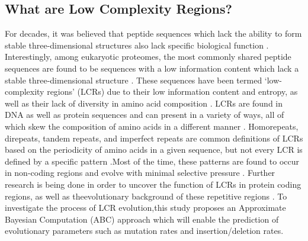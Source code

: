 \documentclass{article}
\begin{document}
\subsection{What are Low Complexity Regions?}
For decades, it was believed that peptide sequences which lack the ability to form stable three-dimensional structures also lack specific biological function \citep{haerty2010low}. Interestingly, among eukaryotic proteomes, the most commonly
shared peptide sequences are found to be sequences with a low information content which lack a stable three-dimensional
structure \citep{haerty2010low, marcotte1999census, bannen2007effect}. These sequences have been termed ‘low-
complexity regions’ (LCRs) due to their low information content and entropy, as well as their lack of diversity in amino acid
composition \citep{wootton1993statistics, coletta2010low}. LCRs are found in DNA as well as protein sequences and can
present in a variety of ways, all of which skew the composition of amino acids in a different manner \citep{wootton1993statistics, mier2020disentangling}. Homorepeats, direpeats, tandem repeats, and imperfect repeats are common definitions of LCRs based
on the periodicity of amino acids in a given sequence, but not every LCR is defined by a specific pattern \citep{mier2020disentangling}.Most of the time, these patterns are found to occur in non-coding regions and evolve with minimal selective pressure \citep{kruglyak2000distribution}. Further research is being done in order to uncover the function of LCRs in protein coding regions, as well as theevolutionary background of these repetitive regions \citep{huntley2006selection}. To investigate the process of LCR evolution,this study proposes an Approximate Bayesian Computation (ABC) approach which will enable the prediction of evolutionary
parameters such as mutation rates and insertion/deletion rates.
\end{document}
